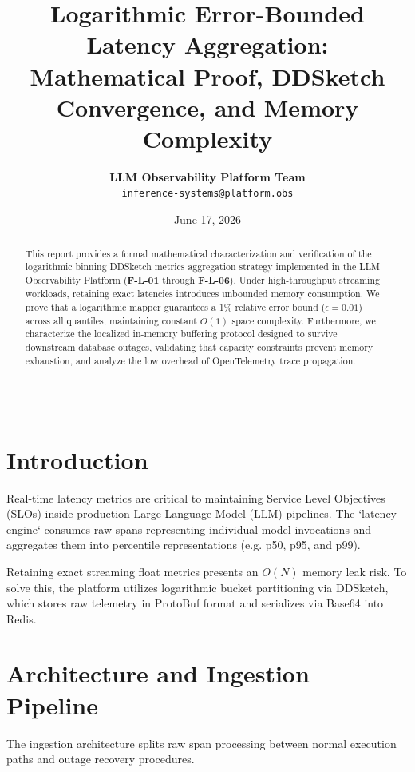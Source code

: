 \documentclass[11pt,a4paper]{article}
\theoremstyle{definition}
\begin{document}
\title{\textbf{Logarithmic Error-Bounded Latency Aggregation: \\ Mathematical Proof, DDSketch Convergence, and Memory Complexity}}
\author{\textbf{LLM Observability Platform Team}\\
        {\small \texttt{inference-systems@platform.obs}}}
\date{June 17, 2026}
\maketitle

\hrule\bigskip

\begin{abstract}
This report provides a formal mathematical characterization and verification of the logarithmic binning DDSketch metrics aggregation strategy implemented in the LLM Observability Platform (\textbf{F-L-01} through \textbf{F-L-06}). Under high-throughput streaming workloads, retaining exact latencies introduces unbounded memory consumption. We prove that a logarithmic mapper guarantees a 1\% relative error bound ($\epsilon = 0.01$) across all quantiles, maintaining constant $O(1)$ space complexity. Furthermore, we characterize the localized in-memory buffering protocol designed to survive downstream database outages, validating that capacity constraints prevent memory exhaustion, and analyze the low overhead of OpenTelemetry trace propagation.
\end{abstract}

\section{Introduction}\label{sec:intro}
Real-time latency metrics are critical to maintaining Service Level Objectives (SLOs) inside production Large Language Model (LLM) pipelines. The `latency-engine` consumes raw spans representing individual model invocations and aggregates them into percentile representations (e.g. p50, p95, and p99). 

Retaining exact streaming float metrics presents an $O(N)$ memory leak risk. To solve this, the platform utilizes logarithmic bucket partitioning via DDSketch, which stores raw telemetry in ProtoBuf format and serializes via Base64 into Redis.

\section{Architecture and Ingestion Pipeline}\label{sec:architecture}
The ingestion architecture splits raw span processing between normal execution paths and outage recovery procedures.
\end{document}
